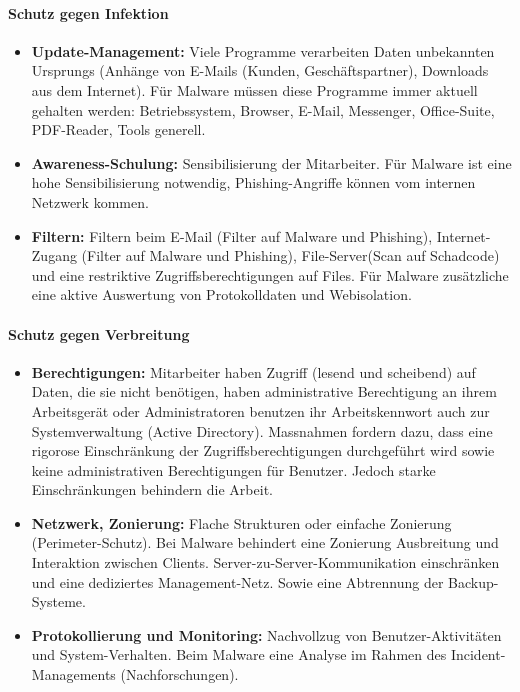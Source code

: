 \documentclass[10pt,a4paper]{article}
\begin{document}
\paragraph*{Schutz gegen Infektion}
\begin{itemize}[noitemsep,topsep=0pt,leftmargin=*]
	\item \textbf{Update-Management:} Viele Programme verarbeiten Daten unbekannten Ursprungs (Anhänge von E-Mails (Kunden, Geschäftspartner), Downloads aus dem Internet). Für Malware müssen diese Programme immer aktuell gehalten werden: Betriebssystem, Browser, E-Mail, Messenger, Office-Suite, PDF-Reader, Tools generell.
	\item \textbf{Awareness-Schulung:} Sensibilisierung der Mitarbeiter. Für Malware ist eine hohe Sensibilisierung notwendig, Phishing-Angriffe können vom internen Netzwerk kommen.
	\item \textbf{Filtern:} Filtern beim E-Mail (Filter auf Malware und Phishing), Internet-Zugang (Filter auf Malware und Phishing), File-Server(Scan auf Schadcode) und eine restriktive Zugriffsberechtigungen auf Files. Für Malware zusätzliche eine aktive Auswertung von Protokolldaten und Webisolation.
\end{itemize}
\paragraph*{Schutz gegen Verbreitung}
\begin{itemize}[noitemsep,topsep=0pt,leftmargin=*]
	\item \textbf{Berechtigungen:} Mitarbeiter haben Zugriff (lesend und scheibend) auf Daten, die sie nicht benötigen, haben administrative Berechtigung an ihrem Arbeitsgerät oder Administratoren benutzen ihr Arbeitskennwort auch zur Systemverwaltung (Active Directory). Massnahmen fordern dazu, dass eine rigorose Einschränkung der Zugriffsberechtigungen durchgeführt wird sowie keine administrativen Berechtigungen für Benutzer. Jedoch starke Einschränkungen behindern die Arbeit.
	\item \textbf{Netzwerk, Zonierung:} Flache Strukturen oder einfache Zonierung (Perimeter-Schutz). Bei Malware behindert eine Zonierung Ausbreitung und Interaktion zwischen Clients. Server-zu-Server-Kommunikation einschränken und eine dediziertes Management-Netz. Sowie eine Abtrennung der Backup-Systeme.
	\item \textbf{Protokollierung und Monitoring:} Nachvollzug von Benutzer-Aktivitäten und System-Verhalten. Beim Malware eine Analyse im Rahmen des Incident-Managements (Nachforschungen).
\end{itemize}
\end{document}
